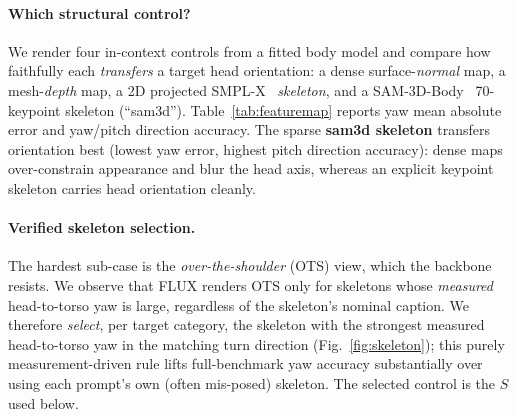 \paragraph{Which structural control?} We render four in-context controls from a
fitted body model and compare how faithfully each \emph{transfers} a target head
orientation: a dense surface-\emph{normal} map, a mesh-\emph{depth} map, a 2D
projected SMPL-X~\cite{smplestx} \emph{skeleton}, and a SAM-3D-Body~\cite{sam}
70-keypoint skeleton (``sam3d''). Table~\ref{tab:featuremap} reports yaw mean
absolute error and yaw/pitch direction accuracy. The sparse \textbf{sam3d
skeleton} transfers orientation best (lowest yaw error, highest pitch
direction accuracy): dense maps over-constrain appearance and blur the head
axis, whereas an explicit keypoint skeleton carries head orientation cleanly.

\begin{table}[t]\centering\small
\setlength{\tabcolsep}{5pt}
\caption[Which in-context structural control transfers head orientation best]{\textbf{Which in-context structural control transfers head orientation
best} (cross-pose transfer, $n{=}1560$ pairs/control; yaw MAE in degrees,
direction accuracy in \%). The sparse SAM-3D keypoint skeleton gives the lowest
yaw error and highest direction accuracy; dense surface maps over-constrain
appearance and blur the head axis. The \emph{do-nothing} yaw MAE is $52.5^\circ$.}
\label{tab:featuremap}
\end{table}

\paragraph{Verified skeleton selection.} The hardest sub-case is the
\emph{over-the-shoulder} (OTS) view, which the backbone resists. We observe that
FLUX renders OTS only for skeletons whose \emph{measured} head-to-torso yaw is
large, regardless of the skeleton's nominal caption. We therefore \emph{select},
per target category, the skeleton with the strongest measured head-to-torso yaw
in the matching turn direction (Fig.~\ref{fig:skeleton}); this purely
measurement-driven rule lifts full-benchmark yaw accuracy substantially over
using each prompt's own (often mis-posed) skeleton. The selected control is the
$S$ used below.

